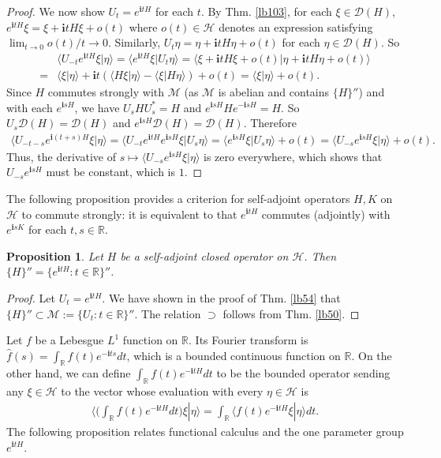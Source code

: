\documentclass[12pt,b5paper,notitlepage]{article}
\theoremstyle{definition}
\theoremstyle{plain}
\newtheorem{pp}[df]{Proposition}
\newcommand{\mc}{\mathcal}
\newcommand{\wht}{\widehat}
\newcommand{\Dom}{\scr D}
\newcommand{\bk}[1]{\langle {#1}\rangle}
\newcommand{\scr}{\mathscr}
\newcommand{\im}{\mathbf{i}}
\newcommand{\Rbb}{\mathbb R}
\numberwithin{equation}{section}
\begin{document}
\begin{proof}
We now show $U_t=e^{\im tH}$ for each $t$. By Thm. \ref{lb103}, for each $\xi\in\Dom(H)$, $e^{\im tH}\xi=\xi+\im tH\xi+o(t)$ where $o(t)\in\mc H$ denotes an expression satisfying $\lim_{t\rightarrow 0}o(t)/t\rightarrow 0$. Similarly, $U_t\eta=\eta+\im tH\eta+o(t)$ for each $\eta\in\Dom(H)$. So
\begin{align*}
&\bk{U_{-t}e^{\im tH}\xi|\eta}=\bk{e^{\im tH}\xi|U_t\eta}=\bk{\xi+\im tH\xi+o(t)|\eta+\im tH\eta+o(t)}\\
=&\bk{\xi|\eta}+\im t(\bk{H\xi|\eta}-\bk{\xi|H\eta})+o(t)=\bk{\xi|\eta}+o(t).	
\end{align*}
Since $H$ commutes strongly with $\mc M$ (as $\mc M$ is abelian and contains $\{H\}''$) and with each $e^{\im sH}$, we have $U_sHU_s^*=H$ and $e^{\im sH}H e^{-\im sH}=H$. So $U_s\Dom(H)=\Dom(H)$ and  $e^{\im sH}\Dom(H)=\Dom(H)$. Therefore
\begin{align*}
\bk{U_{-t-s}e^{\im (t+s)H}\xi|\eta}=\bk{U_{-t}e^{\im tH}e^{\im sH}\xi|U_s\eta}=\bk{e^{\im sH}\xi|U_s\eta}+o(t)=\bk{U_{-s}e^{\im sH}\xi|\eta}+o(t).
\end{align*}
Thus, the derivative of $s\mapsto \bk{U_{-s}e^{\im sH}\xi|\eta}$ is zero everywhere, which shows that $U_{-s}e^{\im sH}$ must be constant, which is $1$.
\end{proof}


The following proposition provides a criterion for self-adjoint operators $H,K$ on $\mc H$ to commute strongly: it is equivalent to that $e^{\im tH}$ commutes (adjointly) with $e^{\im sK}$ for each $t,s\in\Rbb$.


\begin{pp}
Let $H$ be a self-adjoint closed operator on $\mc H$. Then $\{H\}''=\{e^{\im tH}:t\in\Rbb\}''$.
\end{pp}

\begin{proof}
Let $U_t=e^{\im tH}$. We have shown in the proof of Thm. \ref{lb54} that $\{H\}''\subset \mc M:=\{U_t:t\in\Rbb\}''$. The relation $\supset$ follows from Thm. \ref{lb50}.
\end{proof}



Let $f$ be a Lebesgue $L^1$ function on $\Rbb$. Its Fourier transform is $\wht f(s)=\int_\Rbb f(t)e^{-\im ts}dt$, which is a bounded continuous function on $\Rbb$. On the other hand, we can define $\int_\Rbb f(t)e^{-\im tH}dt$ to be the bounded operator sending any $\xi\in\mc H$ to the vector whose evaluation with every $\eta\in\mc H$ is
\begin{align*}
\Big\langle \big(\int_\Rbb f(t)e^{-\im tH}dt\big)\xi|\eta  \Big\rangle	=\int_\Rbb\big\langle f(t)e^{-\im tH}\xi|\eta\big\rangle dt.
\end{align*} 
The following proposition relates functional calculus and the one parameter group $e^{\im tH}$.
\end{document}
